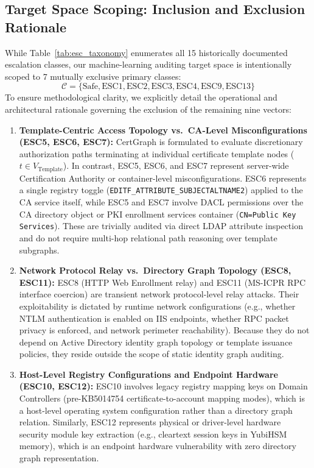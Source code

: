 \subsection{Target Space Scoping: Inclusion and Exclusion Rationale}
\label{sec:esc_scoping}
While Table~\ref{tab:esc_taxonomy} enumerates all 15 historically documented escalation classes, our machine-learning auditing target space is intentionally scoped to 7 mutually exclusive primary classes:
\begin{equation}
\mathcal{C} = \{\text{Safe}, \text{ESC1}, \text{ESC2}, \text{ESC3}, \text{ESC4}, \text{ESC9}, \text{ESC13}\}
\end{equation}
To ensure methodological clarity, we explicitly detail the operational and architectural rationale governing the exclusion of the remaining nine vectors:
\begin{enumerate}
    \item \textbf{Template-Centric Access Topology vs.\ CA-Level Misconfigurations (ESC5, ESC6, ESC7):} CertGraph is formulated to evaluate discretionary authorization paths terminating at individual certificate template nodes ($t \in V_{\text{Template}}$). In contrast, ESC5, ESC6, and ESC7 represent server-wide Certification Authority or container-level misconfigurations. ESC6 represents a single registry toggle (\texttt{EDITF\_ATTRIBUTE\_SUBJECTALTNAME2}) applied to the CA service itself, while ESC5 and ESC7 involve DACL permissions over the CA directory object or PKI enrollment services container (\texttt{CN=Public Key Services}). These are trivially audited via direct LDAP attribute inspection and do not require multi-hop relational path reasoning over template subgraphs.
    \item \textbf{Network Protocol Relay vs.\ Directory Graph Topology (ESC8, ESC11):} ESC8 (HTTP Web Enrollment relay) and ESC11 (MS-ICPR RPC interface coercion) are transient network protocol-level relay attacks. Their exploitability is dictated by runtime network configurations (e.g., whether NTLM authentication is enabled on IIS endpoints, whether RPC packet privacy is enforced, and network perimeter reachability). Because they do not depend on Active Directory identity graph topology or template issuance policies, they reside outside the scope of static identity graph auditing.
    \item \textbf{Host-Level Registry Configurations and Endpoint Hardware (ESC10, ESC12):} ESC10 involves legacy registry mapping keys on Domain Controllers (pre-KB5014754 certificate-to-account mapping modes), which is a host-level operating system configuration rather than a directory graph relation. Similarly, ESC12 represents physical or driver-level hardware security module key extraction (e.g., cleartext session keys in YubiHSM memory), which is an endpoint hardware vulnerability with zero directory graph representation.

\end{enumerate}
